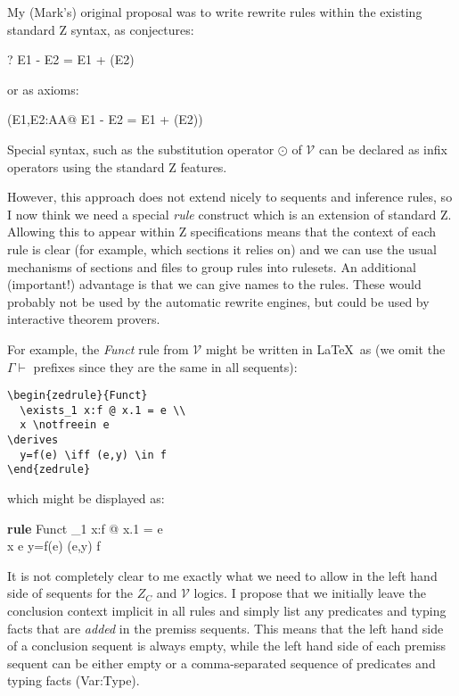 \documentclass{article}
\newcommand{\V}{\mathcal{V}}
\newenvironment{zedrule}[1]{\par\textbf{rule }#1\vspace{-2ex}\infrule}{\endinfrule}
\newcommand{\derives}{\derive{}}
\newcommand{\notfreein}{\mathbin{\backslash}}
\newcommand{\negate}{\mathop{-}}
\newcommand{\arithmos}{{A\!\!\!\!A}}   %
\begin{document}
My (Mark's) original proposal was to write rewrite rules within the
existing standard Z syntax, as conjectures:
\begin{zed}
  \vdash? E1 - E2 = E1 + (\negate E2)
\end{zed}
or as axioms:
\begin{axdef}
\where
  (\forall E1,E2:\arithmos @ E1 - E2 = E1 + (\negate E2))
\end{axdef}
Special syntax, such as the substitution operator $\odot$ of $\mathcal{V}$
can be declared as infix operators using the standard Z features.

However, this approach does not extend nicely to sequents and
inference rules, so I now think we need a special \emph{rule} construct
which is an extension of standard Z.  Allowing this to appear within
Z specifications means that the context of each rule is clear
(for example, which sections it relies on) and we can use the usual
mechanisms of sections and files to group rules into rulesets.
An additional (important!) advantage is that we can give names
to the rules.  These would probably not be used by the automatic rewrite
engines, but could be used by interactive theorem provers.

For example, the \emph{Funct} rule from $\mathcal{V}$ might be
written in \LaTeX\ as (we omit the $\Gamma \vdash$ prefixes
since they are the same in all sequents):
\begin{verbatim}
\begin{zedrule}{Funct}
  \exists_1 x:f @ x.1 = e \\
  x \notfreein e
\derives
  y=f(e) \iff (e,y) \in f
\end{zedrule}
\end{verbatim}

which might be displayed as:
\begin{zedrule}{Funct}
  \exists_1 x:f @ x.1 = e \\
  x \notfreein e
\derives
  y=f(e) \iff (e,y) \in f
\end{zedrule}

It is not completely clear to me exactly what we need to
allow in the left hand side of sequents for the $Z_C$ and $\V$
logics.  I propose that we initially leave the conclusion context implicit
in all rules and simply list any predicates and typing facts that
are \emph{added} in the premiss sequents.  This means that the
left hand side of a conclusion sequent is always empty, while the
left hand side of each premiss sequent can be either empty or
a comma-separated sequence of predicates and typing facts (Var:Type).
\end{document}
